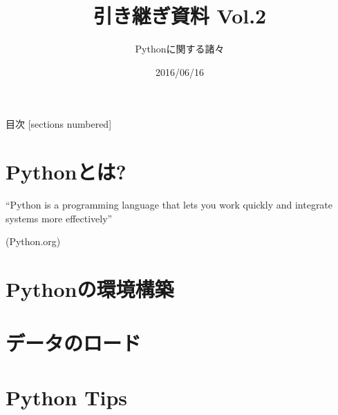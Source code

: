 \documentclass[12pt, dvipdfmx]{beamer}
\title{引き継ぎ資料 Vol.2}
\subtitle{Pythonに関する諸々}
\date{2016/06/16}
\author{}
\institute{}
\begin{document}
\maketitle
\begin{frame}{目次}
  [sections numbered]
  \tableofcontents[hideallsubsections]
\end{frame}

\section{Pythonとは?}
\begin{frame}
    ``Python is a programming language that lets you work quickly and integrate systems more effectively''
    \begin{flushright}
        (Python.org)
    \end{flushright}
\end{frame}

\section{Pythonの環境構築}

\section{データのロード}

\section{Python Tips}
\end{document}
